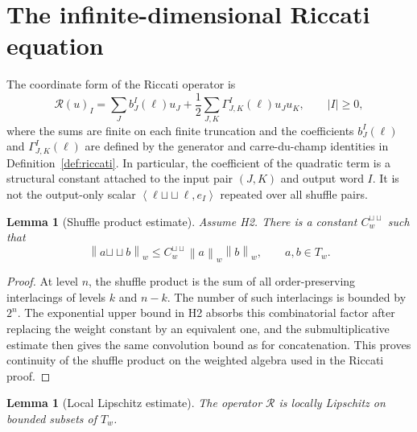 \documentclass[11pt,oneside]{article}
\theoremstyle{plain}
\newtheorem{lemma}[theorem]{Lemma}
\theoremstyle{definition}
\theoremstyle{remark}
\newcommand{\Tw}{T_w}
\newcommand{\Rs}{\mathcal R}
\newcommand{\sh}{\mathbin{\sqcup\!\sqcup}}
\newcommand{\norm}[1]{\left\lVert #1\right\rVert}
\newcommand{\inner}[2]{\left\langle #1,#2\right\rangle}
\begin{document}
\section{The infinite-dimensional Riccati equation}\label{app:riccati}

The coordinate form of the Riccati operator is
\begin{equation}\label{eq:riccati-coordinate}
\Rs(u)_I=\sum_J b_J^I(\ell)u_J+\frac12\sum_{J,K}\Gamma^I_{J,K}(\ell)u_Ju_K,
\qquad |I|\geq0,
\end{equation}
where the sums are finite on each finite truncation and the coefficients $b_J^I(\ell)$ and $\Gamma^I_{J,K}(\ell)$ are defined by the generator and carre-du-champ identities in Definition~\ref{def:riccati}. In particular, the coefficient of the quadratic term is a structural constant attached to the input pair $(J,K)$ and output word $I$. It is not the output-only scalar $\inner{\ell\sh\ell}{e_I}$ repeated over all shuffle pairs.

\begin{lemma}[Shuffle product estimate]
\label{lem:shuffle-product-estimate-app}
Assume H2. There is a constant $C_w^{\sh}$ such that
\[
\norm{a\sh b}_w\leq C_w^{\sh}\norm{a}_w\norm{b}_w,
\qquad a,b\in\Tw.
\]
\end{lemma}

\begin{proof}
At level $n$, the shuffle product is the sum of all order-preserving interlacings of levels $k$ and $n-k$. The number of such interlacings is bounded by $2^n$. The exponential upper bound in H2 absorbs this combinatorial factor after replacing the weight constant by an equivalent one, and the submultiplicative estimate then gives the same convolution bound as for concatenation. This proves continuity of the shuffle product on the weighted algebra used in the Riccati proof.
\end{proof}

\begin{lemma}[Local Lipschitz estimate]
The operator $\Rs$ is locally Lipschitz on bounded subsets of $\Tw$.
\end{lemma}
\end{document}
